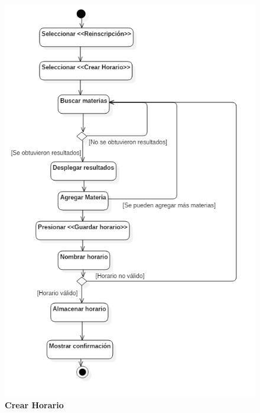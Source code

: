 \begin{figure}[H]
  \centering
    \includegraphics[scale=.85,angle=0]{project/Actividades/crear_horario.png}
  \caption{\textbf{Crear Horario}}
\end{figure}
